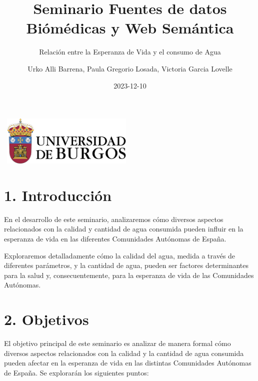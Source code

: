\documentclass[
]{article}
\title{Seminario Fuentes de datos Biómédicas y Web Semántica}
\subtitle{Relación entre la Esperanza de Vida y el consumo de Agua}
\author{Urko Alli Barrena, Paula Gregorio Losada, Victoria Garcia
Lovelle}
\date{2023-12-10}
\begin{document}
\maketitle

{
\setcounter{tocdepth}{6}
\tableofcontents
}
\includegraphics[width=2.60417in,height=0.9375in]{INPUT/images/EscudoUBU.png}

\hypertarget{introducciuxf3n}{%
\section{1. Introducción}\label{introducciuxf3n}}

En el desarrollo de este seminario, analizaremos cómo diversos aspectos
relacionados con la calidad y cantidad de agua consumida pueden influir
en la esperanza de vida en las diferentes Comunidades Autónomas de
España.

Exploraremos detalladamente cómo la calidad del agua, medida a través de
diferentes parámetros, y la cantidad de agua, pueden ser factores
determinantes para la salud y, consecuentemente, para la esperanza de
vida de las Comunidades Autónomas.

\hypertarget{objetivos}{%
\section{2. Objetivos}\label{objetivos}}

El objetivo principal de este seminario es analizar de manera formal
cómo diversos aspectos relacionados con la calidad y la cantidad de agua
consumida pueden afectar en la esperanza de vida en las distintas
Comunidades Autónomas de España. Se explorarán los siguientes puntos:
\end{document}
